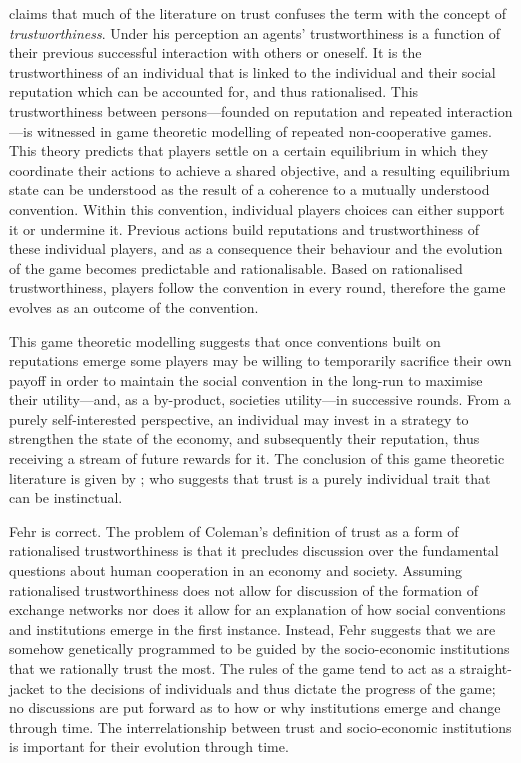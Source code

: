 \begin{subappendices}
\citet{Hardin2006} claims that much of the literature on trust confuses the term with the concept of \textit{trustworthiness}. Under his perception an agents' trustworthiness is a function of their previous successful interaction with others or oneself. It is the trustworthiness of an individual that is linked to the individual and their social reputation which can be accounted for, and thus rationalised. This trustworthiness between persons---founded on reputation and repeated interaction---is witnessed in game theoretic modelling of repeated non-cooperative games. This theory predicts that players settle on a certain equilibrium in which they coordinate their actions to achieve a shared objective, and a resulting equilibrium state can be understood as the result of a coherence to a mutually understood convention. Within this convention, individual players choices can either support it or undermine it. Previous actions build reputations and trustworthiness of these individual players, and as a consequence their behaviour and the evolution of the game becomes predictable and rationalisable. Based on rationalised trustworthiness, players follow the convention in every round, therefore the game evolves as an outcome of the convention.

This game theoretic modelling suggests that once conventions built on reputations emerge some players may be willing to temporarily sacrifice their own payoff in order to maintain the social convention in the long-run to maximise their utility---and, as a by-product, societies utility---in successive rounds. From a purely self-interested perspective, an individual may invest in a strategy to strengthen the state of the economy, and subsequently their reputation, thus receiving a stream of future rewards for it. The conclusion of this game theoretic literature is given by \citet{Fehr2009}; who suggests that trust is a purely individual trait that can be instinctual.

Fehr is correct. The problem of Coleman's definition of trust as a form of rationalised trustworthiness is that it precludes discussion over the fundamental questions about human cooperation in an economy and society. Assuming rationalised trustworthiness does not allow for discussion of the formation of exchange networks nor does it allow for an explanation of how social conventions and institutions emerge in the first instance. Instead, Fehr suggests that we are somehow genetically programmed to be guided by the socio-economic institutions that we rationally trust the most. The rules of the game tend to act as a straight-jacket to the decisions of individuals and thus dictate the progress of the game; no discussions are put forward as to how or why institutions emerge and change through time. The interrelationship between trust and socio-economic institutions is important for their evolution through time.


\end{subappendices}
